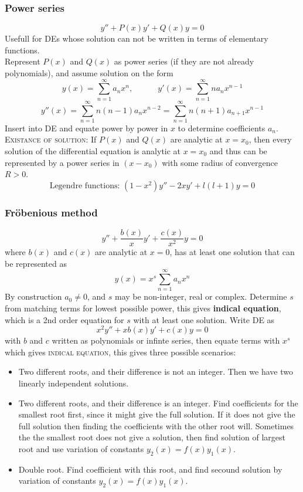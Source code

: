 \documentclass[a4paper, 10pt]{article}
\begin{document}
\begin{multicols*}{3}
\subsubsection*{\small Power series}
$$ y'' + P(x)y' + Q(x)y = 0$$
Usefull for DEs whose solution can not be written in terms of elementary functions. \\
Represent $P(x)$ and $Q(x)$ as power series (if they are not already polynomials), and assume solution on the form
$$ y(x) = \sum_{n=1}^{\infty} a_n x^n, \qquad \quad y'(x) = \sum_{n=1}^{\infty} na_n x^{n-1}$$ $$y''(x) = \sum_{n=1}^{\infty} n(n-1)a_n x^{n-2} = \sum_{n=1}^{\infty} n(n+1)a_{n+1} x^{n-1}$$
Insert into DE and equate power by power in $x$ to determine coefficients $a_n$.\\
\textsc{Existance of solution:} If $P(x)$ and $Q(x)$ are analytic at $x=x_0$, then every solution of the differential equation is analytic at $x=x_0$ and thus can be represented by a power series in $(x-x_0)$ with some radius of convergence $R>0$.
$$ \text{Legendre functions: } (1-x^2)y'' -2xy' + l(l+1)y = 0$$


\subsubsection*{\small Fröbenious method}
$$y'' + \frac{b(x)}{x}y' + \frac{c(x)}{x^2}y = 0 $$
where $b(x)$ and $c(x)$ are analytic at $x=0$, has at least one solution that can be represented as
$$y(x) = x^s \sum_{n=1}^{\infty} a_n x^n$$
By construction $a_0 \neq 0$, and $s$ may be non-integer, real or complex.
Determine $s$ from matching terms for lowest possible power, this gives \textbf{indical equation}, which is a 2nd order equation for $s$ with at least one solution. Write DE as
$$ x^2y'' + xb(x)y' + c(x)y = 0$$
with $b$ and $c$ written as polynomials or infinte series, then equate terms with $x^s$ which gives \textsc{indical equation}, this gives three possible scenarios:
\begin{itemize}
  \item Two different roots, and their difference is not an integer. Then we have two linearly independent solutions.
  \item Two different roots, and their difference is an integer. Find coefficients for the smallest root first, since it might give the full solution. If it does not give the full solution then finding the coefficients with the other root will. Sometimes the the smallest root does not give a solution, then find solution of largest root and use variation of constants $y_2(x) = f(x)y_1(x)$.
  \item Double root. Find coefficient with this root, and find secound solution by variation of constants $y_2(x) = f(x)y_1(x)$.
\end{itemize}


\end{multicols*}
\end{document}
